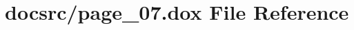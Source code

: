 \hypertarget{page__07_8dox}{\section{docsrc/page\-\_\-07.dox File Reference}
\label{page__07_8dox}
}
